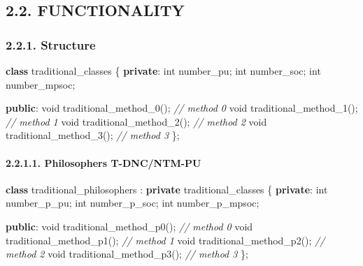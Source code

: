 \documentclass[
]{article}
\newenvironment{Shaded}{}{}
\newcommand{\CommentTok}[1]{\textcolor[rgb]{0.38,0.63,0.69}{\textit{#1}}}
\newcommand{\DataTypeTok}[1]{\textcolor[rgb]{0.56,0.13,0.00}{#1}}
\newcommand{\KeywordTok}[1]{\textcolor[rgb]{0.00,0.44,0.13}{\textbf{#1}}}
\newcommand{\NormalTok}[1]{#1}
\begin{document}
\hypertarget{functionality}{%
\subsection{2.2. FUNCTIONALITY}\label{functionality}}

\hypertarget{structure}{%
\subsubsection{2.2.1. Structure}\label{structure}}

\begin{Shaded}
\begin{Highlighting}[]
\KeywordTok{class}\NormalTok{ traditional\_classes \{}
   \KeywordTok{private}\NormalTok{:}
      \DataTypeTok{int}\NormalTok{ number\_pu;}
      \DataTypeTok{int}\NormalTok{ number\_soc;}
      \DataTypeTok{int}\NormalTok{ number\_mpsoc;}

   \KeywordTok{public}\NormalTok{:}
      \DataTypeTok{void}\NormalTok{ traditional\_method\_0();  }\CommentTok{// method 0}
      \DataTypeTok{void}\NormalTok{ traditional\_method\_1();  }\CommentTok{// method 1}
      \DataTypeTok{void}\NormalTok{ traditional\_method\_2();  }\CommentTok{// method 2}
      \DataTypeTok{void}\NormalTok{ traditional\_method\_3();  }\CommentTok{// method 3}
\NormalTok{\};}
\end{Highlighting}
\end{Shaded}

\hypertarget{philosophers-t-dncntm-pu}{%
\paragraph{2.2.1.1. Philosophers
T-DNC/NTM-PU}\label{philosophers-t-dncntm-pu}}

\begin{Shaded}
\begin{Highlighting}[]
\KeywordTok{class}\NormalTok{ traditional\_philosophers : }\KeywordTok{private}\NormalTok{ traditional\_classes \{}
   \KeywordTok{private}\NormalTok{:}
      \DataTypeTok{int}\NormalTok{ number\_p\_pu;}
      \DataTypeTok{int}\NormalTok{ number\_p\_soc;}
      \DataTypeTok{int}\NormalTok{ number\_p\_mpsoc;}

   \KeywordTok{public}\NormalTok{:}
      \DataTypeTok{void}\NormalTok{ traditional\_method\_p0();  }\CommentTok{// method 0}
      \DataTypeTok{void}\NormalTok{ traditional\_method\_p1();  }\CommentTok{// method 1}
      \DataTypeTok{void}\NormalTok{ traditional\_method\_p2();  }\CommentTok{// method 2}
      \DataTypeTok{void}\NormalTok{ traditional\_method\_p3();  }\CommentTok{// method 3}
\NormalTok{\};}
\end{Highlighting}
\end{Shaded}
\end{document}
